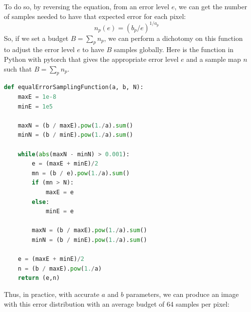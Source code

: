 \documentclass{classeENS}
\begin{document}
\par To do so, by reversing the equation, from an error level $e$, we can get the number 
of samples needed to have that expected error for each pixel:
\[ n_p(e) = (b_p/e)^{1/a_p} \]
So, if we set a budget $B = \sum_p n_p$, we can perform a dichotomy 
on this function to adjust the error level $e$ to have $B$ samples 
globally. Here is the function in Python with pytorch that gives the appropriate 
error level $e$ and a sample map $n$ such that $B = \sum_p n_p$.
\begin{lstlisting}[language=Python, caption=Equal Error]
def equalErrorSamplingFunction(a, b, N):
    maxE = 1e-8
    minE = 1e5

    maxN = (b / maxE).pow(1./a).sum()
    minN = (b / minE).pow(1./a).sum()

    while(abs(maxN - minN) > 0.001):
        e = (maxE + minE)/2
        mn = (b / e).pow(1./a).sum()
        if (mn > N):
            maxE = e
        else:
            minE = e

        maxN = (b / maxE).pow(1./a).sum()
        minN = (b / minE).pow(1./a).sum()

    e = (maxE + minE)/2
    n = (b / maxE).pow(1./a)
    return (e,n) \end{lstlisting}

Thus, in practice, with accurate $a$ and $b$ parameters, 
we can produce an image with this error distribution with 
an average budget of 64 samples per pixel:
\end{document}
